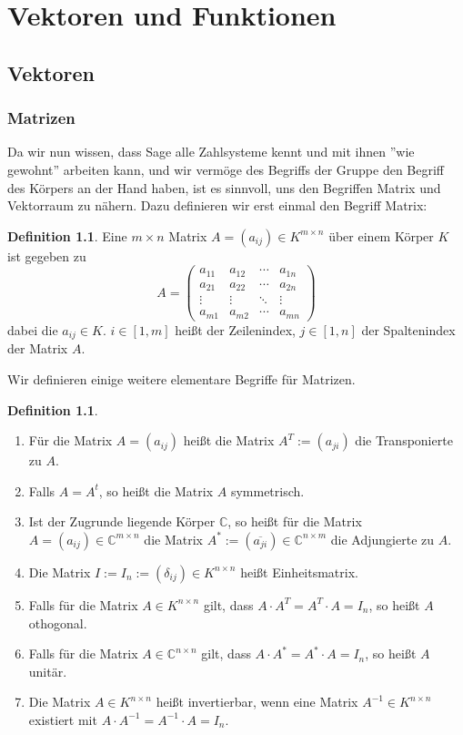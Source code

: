 \documentclass[fontsize=12pt,paper=a4,twoside,bibtotoc,idxtotoc,
liststotoc,pagesize,BCOR1.2cm,DIV15,chapterprefix,pagesize=pdftex]{scrbook}
\theoremstyle{plain}
\theoremstyle{definition}
\newtheorem{df}[equation]{Definition}
\theoremstyle{remark}
\begin{document}
\chapter{Vektoren und Funktionen}
\section{Vektoren}
\subsection{Matrizen}
Da wir nun wissen, dass Sage alle Zahlsysteme kennt und mit ihnen ''wie gewohnt'' arbeiten kann, und wir vermöge des Begriffs der Gruppe den Begriff des Körpers an der Hand haben, ist es 
sinnvoll, uns den Begriffen Matrix und Vektorraum zu nähern. Dazu definieren wir erst einmal den Begriff Matrix:
\begin{df}
Eine $m \times n$ Matrix $A=(a_{ij}) \in K^{m\times n}$ über einem Körper $K$ ist gegeben zu
\[ A = \left( \begin{array}{cccc}
a_{11} & a_{12} & \cdots & a_{1n} \\
a_{21} & a_{22} & \cdots & a_{2n} \\
\vdots & \vdots & \ddots & \vdots \\
a_{m1} & a_{m2} & \cdots & a_{mn} 
\end{array} \right) \] 
dabei die $a_{ij} \in K$. $i\in[1,m]$ heißt der Zeilenindex, $j\in [1,n]$ der Spaltenindex der Matrix $A$.
\end{df}
Wir definieren einige weitere elementare Begriffe für Matrizen.
\begin{df}
\begin{enumerate}
\item Für die Matrix $A=(a_{ij})$ heißt die Matrix $A^T:=(a_{ji})$ die Transponierte zu $A$.
\item Falls $A=A^t$, so heißt die Matrix $A$ symmetrisch. 
\item Ist der Zugrunde liegende Körper $\mathbb{C}$, so heißt für die Matrix $A=(a_{ij})\in \mathbb{C}^{m\times n}$ die Matrix $A^* :=
(\overline{a_{ji}}) \in \mathbb{C}^{n \times m}$ die Adjungierte zu $A$.
\item Die Matrix $I:=I_n:=(\delta_{ij}) \in K^{n \times n}$ heißt Einheitsmatrix.
\item Falls für die Matrix $A\in K^{n \times n}$ gilt, dass $A \cdot A^T=A^T \cdot A=I_n$, so heißt $A$ othogonal.
\item Falls für die Matrix $A\in \mathbb{C}^{n \times n}$ gilt, dass $A \cdot A^*=A^* \cdot A=I_n$, so heißt $A$ unitär.
\item Die Matrix $A\in K^{n \times n}$ heißt invertierbar, wenn eine Matrix $A^{-1}\in K^{n \times n}$ existiert mit  $A \cdot
A^{-1}=A^{-1} \cdot A=I_n$.
\end{enumerate}
\end{df}
\end{document}
